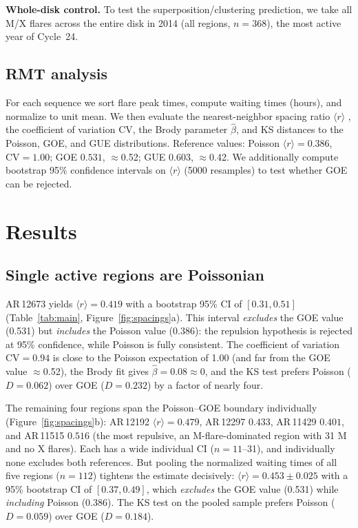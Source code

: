 \documentclass[12pt,a4paper]{article}
\begin{document}
\textbf{Whole-disk control.} To test the superposition/clustering prediction, we take all M/X flares across the entire disk in 2014 (all regions, $n=368$), the most active year of Cycle~24.

\subsection{RMT analysis}

For each sequence we sort flare peak times, compute waiting times (hours), and normalize to unit mean. We then evaluate the nearest-neighbor spacing ratio $\langle r\rangle$ \citep{atas2013}, the coefficient of variation $\mathrm{CV}$, the Brody parameter $\hat\beta$, and KS distances to the Poisson, GOE, and GUE distributions. Reference values: Poisson $\langle r\rangle=0.386$, $\mathrm{CV}=1.00$; GOE $0.531$, $\approx$0.52; GUE $0.603$, $\approx$0.42. We additionally compute bootstrap 95\% confidence intervals on $\langle r\rangle$ (5000 resamples) to test whether GOE can be rejected.

\section{Results}

\subsection{Single active regions are Poissonian}

AR\,12673 yields $\langle r\rangle=0.419$ with a bootstrap 95\% CI of $[0.31, 0.51]$ (Table~\ref{tab:main}, Figure~\ref{fig:spacings}a). This interval \emph{excludes} the GOE value (0.531) but \emph{includes} the Poisson value (0.386): the repulsion hypothesis is rejected at 95\% confidence, while Poisson is fully consistent. The coefficient of variation $\mathrm{CV}=0.94$ is close to the Poisson expectation of 1.00 (and far from the GOE value $\approx$0.52), the Brody fit gives $\hat\beta=0.08\approx0$, and the KS test prefers Poisson ($D=0.062$) over GOE ($D=0.232$) by a factor of nearly four.

The remaining four regions span the Poisson--GOE boundary individually (Figure~\ref{fig:spacings}b): AR\,12192 $\langle r\rangle=0.479$, AR\,12297 $0.433$, AR\,11429 $0.401$, and AR\,11515 $0.516$ (the most repulsive, an M-flare-dominated region with 31 M and no X flares). Each has a wide individual CI ($n=11$--31), and individually none excludes both references. But pooling the normalized waiting times of all five regions ($n=112$) tightens the estimate decisively: $\langle r\rangle=0.453\pm0.025$ with a 95\% bootstrap CI of $[0.37, 0.49]$, which \emph{excludes} the GOE value (0.531) while \emph{including} Poisson (0.386). The KS test on the pooled sample prefers Poisson ($D=0.059$) over GOE ($D=0.184$).
\end{document}
